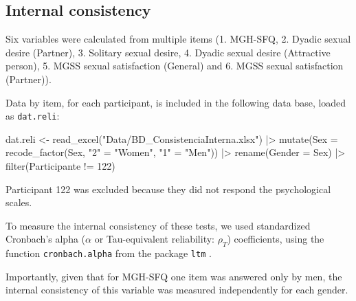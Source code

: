\documentclass[
  bookmarksnumbered]{article}
\newenvironment{Shaded}{\begin{snugshade}}{\end{snugshade}}
\newcommand{\AttributeTok}[1]{\textcolor[rgb]{0.80,0.80,0.80}{#1}}
\newcommand{\DecValTok}[1]{\textcolor[rgb]{0.86,0.86,0.80}{#1}}
\newcommand{\FunctionTok}[1]{\textcolor[rgb]{0.94,0.94,0.56}{#1}}
\newcommand{\NormalTok}[1]{\textcolor[rgb]{0.80,0.80,0.80}{#1}}
\newcommand{\OtherTok}[1]{\textcolor[rgb]{0.94,0.94,0.56}{#1}}
\newcommand{\SpecialCharTok}[1]{\textcolor[rgb]{0.86,0.64,0.64}{#1}}
\newcommand{\StringTok}[1]{\textcolor[rgb]{0.80,0.58,0.58}{#1}}
\begin{document}
\hypertarget{internal-consistency}{%
\subsection{Internal consistency}\label{internal-consistency}}

Six variables were calculated from multiple items (1. MGH-SFQ, 2. Dyadic sexual desire (Partner), 3. Solitary sexual desire, 4. Dyadic sexual desire (Attractive person), 5. MGSS sexual satisfaction (General) and 6. MGSS sexual satisfaction (Partner)).

Data by item, for each participant, is included in the following data base, loaded as \texttt{dat.reli}:

\begin{Shaded}
\begin{Highlighting}[]
\NormalTok{dat.reli }\OtherTok{\textless{}{-}} \FunctionTok{read\_excel}\NormalTok{(}\StringTok{"Data/BD\_ConsistenciaInterna.xlsx"}\NormalTok{)  }\SpecialCharTok{|\textgreater{}}  
  \FunctionTok{mutate}\NormalTok{(}\AttributeTok{Sex =} \FunctionTok{recode\_factor}\NormalTok{(Sex,}
                             \StringTok{"2"} \OtherTok{=} \StringTok{"Women"}\NormalTok{,}
                             \StringTok{"1"} \OtherTok{=} \StringTok{"Men"}\NormalTok{)) }\SpecialCharTok{|\textgreater{}} 
  \FunctionTok{rename}\NormalTok{(}\AttributeTok{Gender =}\NormalTok{ Sex) }\SpecialCharTok{|\textgreater{}} 
  \FunctionTok{filter}\NormalTok{(Participante }\SpecialCharTok{!=} \DecValTok{122}\NormalTok{)}
\end{Highlighting}
\end{Shaded}

Participant 122 was excluded because they did not respond the psychological scales.

To measure the internal consistency of these tests, we used standardized Cronbach's alpha (\(\alpha\) or Tau-equivalent reliability: \(\rho_{T}\)) coefficients, using the function \texttt{cronbach.alpha} from the package \texttt{ltm} \autocite{LtmPackageLatent2006}.

Importantly, given that for MGH-SFQ one item was answered only by men, the internal consistency of this variable was measured independently for each gender.
\end{document}
